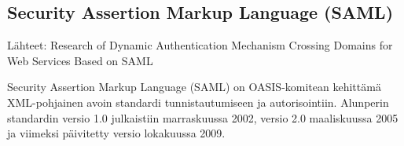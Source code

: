 \subsection{Security Assertion Markup Language (SAML)}

Lähteet: 
Research of Dynamic Authentication Mechanism Crossing Domains for Web Services Based on SAML

Security Assertion Markup Language (SAML) on OASIS-komitean kehittämä XML-pohjainen avoin standardi tunnistautumiseen ja autorisointiin. Alunperin standardin versio 1.0 julkaistiin marraskuussa 2002, versio 2.0 maaliskuussa 2005 ja viimeksi päivitetty versio lokakuussa 2009.


